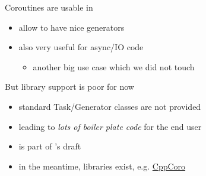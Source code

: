 \begin{frame}[fragile]
  \begin{exampleblock}{Coroutines are usable in }
    \begin{itemize}
    \item allow to have nice generators
    \item also very useful for async/IO code
      \begin{itemize}
      \item another big use case which we did not touch
      \end{itemize}
    \end{itemize}
  \end{exampleblock}
  \begin{alertblock}{But library support is poor for now}
    \begin{itemize}
    \item standard Task/Generator classes are not provided
    \item leading to \emph{lots of boiler plate code} for the end user
    \item {} is part of 's draft
    \item in the meantime, libraries exist, e.g. \href{https://github.com/lewissbaker/cppcoro}{CppCoro}
    \end{itemize}
  \end{alertblock}
\end{frame}
